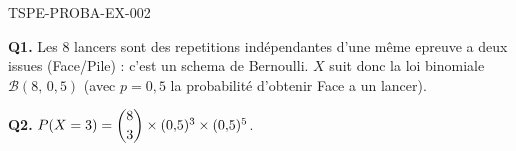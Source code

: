 \begin{corrige}{TSPE-PROBA-EX-002}

\textbf{Q1.} Les $8$ lancers sont des repetitions indépendantes d'une même epreuve a deux issues (Face/Pile) : c'est un schema de Bernoulli. $X$ suit donc la loi binomiale $\mathcal{B}(8,\,0{,}5)$ (avec $p=0{,}5$ la probabilité d'obtenir Face a un lancer).

\textbf{Q2.} $P(X=3) = \dbinom{8}{3}\times(0{,}5)^3\times(0{,}5)^5$.

\end{corrige}
